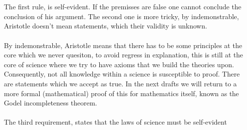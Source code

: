 \documentclass[9pt,a4paper,twocolumn]{article}
\newcounter{theo}
\begin{document}
            \\
            \\
            The first rule, is self-evident. If the premisses are false one cannot conclude the conclusion of his argument. The second one is more tricky, by indemonstrable, Aristotle doesn't mean statements, which their validity is unknown.
            \\
            \\
            By indemonstrable, Aristotle means that there has to be some principles at the core which we never quesiton, to avoid regress in explanation, this is still at the core of science where we try to have axioms that we build the theories upon. Consequently, not all knowledge within a science is susceptible to proof. There are statements which we accept as true. In the next drafts we will return to a more formal (mathematical) proof of this for mathematics itself, known as the Godel incompleteness theorem.
            \\
            \\
            The third requirement, states that the laws of science must be self-evident 



        \newpage
        
        
\end{document}
